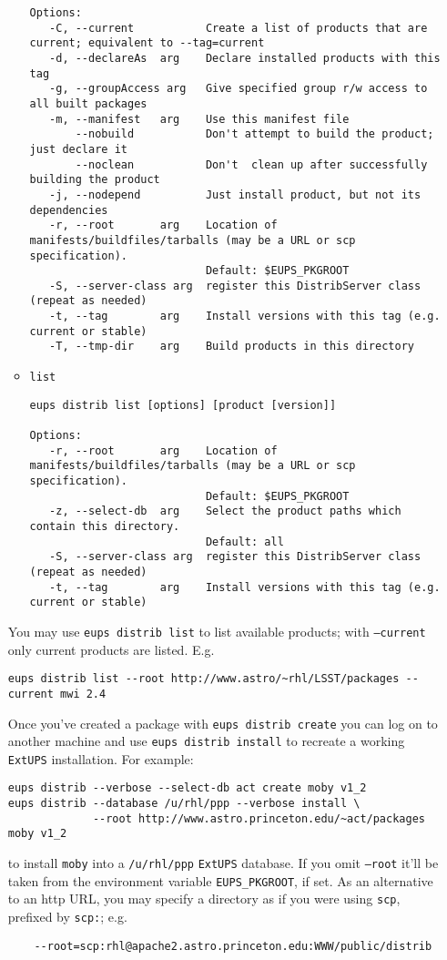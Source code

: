 \documentclass{article}
\newcommand{\code}[1]{\texttt{#1}}
\newcommand{\file}[1]{\texttt{#1}}
\newcommand{\eups}{\code{ExtUPS}}
\begin{document}
\begin{itemize}
\begin{itemize}
\begin{verbatim}
Options:
   -C, --current           Create a list of products that are current; equivalent to --tag=current
   -d, --declareAs  arg    Declare installed products with this tag
   -g, --groupAccess arg   Give specified group r/w access to all built packages
   -m, --manifest   arg    Use this manifest file
       --nobuild           Don't attempt to build the product; just declare it
       --noclean           Don't  clean up after successfully building the product
   -j, --nodepend          Just install product, but not its dependencies
   -r, --root       arg    Location of manifests/buildfiles/tarballs (may be a URL or scp specification).
                           Default: $EUPS_PKGROOT
   -S, --server-class arg  register this DistribServer class (repeat as needed)
   -t, --tag        arg    Install versions with this tag (e.g. current or stable)
   -T, --tmp-dir    arg    Build products in this directory
\end{verbatim}

\item\code{list}
\begin{verbatim}
eups distrib list [options] [product [version]]

Options:
   -r, --root       arg    Location of manifests/buildfiles/tarballs (may be a URL or scp specification).
                           Default: $EUPS_PKGROOT
   -z, --select-db  arg    Select the product paths which contain this directory.
                           Default: all
   -S, --server-class arg  register this DistribServer class (repeat as needed)
   -t, --tag        arg    Install versions with this tag (e.g. current or stable)
\end{verbatim}
\end{itemize}

You may use \code{eups distrib list} to list available products; with \code{--current}
only current products are listed.  E.g.
\begin{verbatim}
eups distrib list --root http://www.astro/~rhl/LSST/packages --current mwi 2.4
\end{verbatim}

Once you've created a package with \code{eups distrib create} you can log on to
another machine and use \code{eups distrib install} to
recreate a working \eups{} installation.  For example:
\begin{verbatim}
eups distrib --verbose --select-db act create moby v1_2
eups distrib --database /u/rhl/ppp --verbose install \
             --root http://www.astro.princeton.edu/~act/packages moby v1_2
\end{verbatim}
to install \code{moby} into a \file{/u/rhl/ppp} \eups{} database. If you omit
\code{--root} it'll be taken from the environment variable \code{EUPS\_PKGROOT},
if set.  As an alternative to an http URL, you may specify a directory as
if you were using \code{scp}, prefixed by \code{scp:}; e.g.
\begin{verbatim}
    --root=scp:rhl@apache2.astro.princeton.edu:WWW/public/distrib
\end{verbatim}


\end{itemize}
\end{document}
